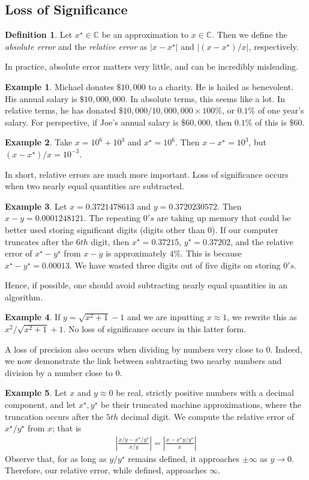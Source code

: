 \documentclass[12pt]{article}
\newcommand{\cc}{\mathbb{C}}
\newcommand{\dollar}{\$}
\theoremstyle{plain}
\theoremstyle{definition}
\newtheorem*{definition}{Definition}
\newtheorem*{example}{Example}
\theoremstyle{remark}
\numberwithin{equation}{section}  %
\begin{document}
\subsection{Loss of Significance}
\begin{definition}
Let $x^\star \in \cc$ be an approximation to $x \in \cc$. Then we define
the \emph{absolute error} and the \emph{relative error} as $|x - x^\star|$
and $|(x - x^\star)/x|$, respectively.
\end{definition}
In practice, absolute error matters very little, and can be incredibly
misleading.
\begin{example}
Michael donates $\dollar 10,000$ to a charity. He is hailed as benevolent. 
His annual salary is $ \dollar 10,000,000$. In absolute terms, this seems like a lot.
In relative terms, he has donated $\dollar 10,000/10,000,000 \times 100 \%$, or $0.1 \%$ of one year's salary. For
perspective, if Joe's annual salary is $\dollar 60,000$, then $0.1 \%$
of this is $\dollar 60$.
\end{example}
\begin{example}
Take $x = 10^6 + 10^3$ and $x^\star = 10^6$. Then $x - x^\star = 10^3$,
but $(x - x^\star)/x = 10^{-3}$.
\end{example}
In short, relative errors are much more important. 
Loss of significance occurs when two nearly equal quantities are subtracted.
\begin{example}
Let $x = 0.3721478613$ and $y = 0.3720230572$. Then $x-y = 0.0001248121$.
The repeating $0's$ are taking up memory that could be better used storing
significant digits (digits other than $0$). If our computer truncates
after the $6th$ digit, then
$x^\star = 0.37215$, $y^\star = 0.37202$, and the relative error
of $x^\star-y^\star$ from $x-y$ is approximately $4\%$. This is because
$x^\star - y^\star = 0.00013$. We have wasted three digits out of
five digits on storing $0's$.
\end{example}
Hence, if possible, one should avoid subtracting nearly equal quantities
in an algorithm.
\begin{example}
If $y = \sqrt{x^2 + 1} -1$ and we are inputting $x \approx 1$, we rewrite this as $x^2/\sqrt{x^2 + 1} + 1$.
No loss of significance occurs in this latter form.
\end{example}
A loss of precision also occurs when dividing by numbers very close to $0$.
Indeed, we now demonstrate the link between subtracting two nearby numbers
and division by a number close to $0$.
\begin{example}
Let $x$ and $y \approx 0$ be real, strictly positive
numbers with a decimal component, and let $x^\star, y^\star$ be their truncated
machine approximations, where the truncation occurs after the $5th$ decimal digit.
We compute the relative error of $x^\star/y^\star$ from $x$; that is
\begin{align*}
	\left |\frac{x/y - x^\star/y^\star}{x/y} \right |   = \left | \frac{x - x^\star
	y/y^\star}{x} \right |
\end{align*}
Observe that, for as long as $y/y^\star$ remains defined, it approaches
$\pm \infty$ as $y \to 0$. 
Therefore, our relative error, while defined, approaches $\infty$.
\end{example}
\end{document}
